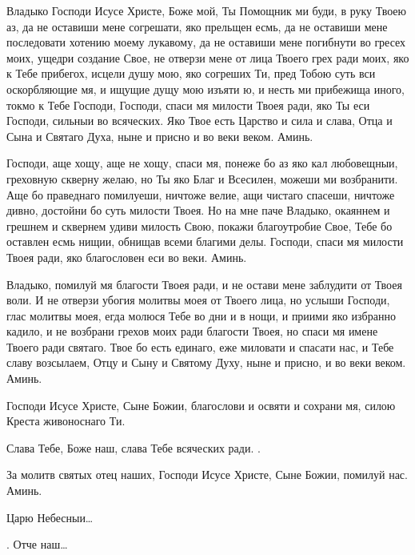 \begin{mymulticols}
Владыко Господи Исусе Христе, Боже мой, Ты Помощник ми буди, в руку Твоею аз, да не оставиши мене согрешати, яко прельщен есмь, да не оставиши мене последовати хотению моему лукавому, да не оставиши мене погибнути во гресех моих, ущедри создание Свое, не отверзи мене от лица Твоего грех ради моих, яко к Тебе прибегох, исцели душу мою, яко согреших Ти, пред Тобою суть вси оскорбляющие мя, и ищущие дущу мою изъяти ю, и несть ми прибежища иного, токмо к Тебе Господи, Господи, спаси мя милости Твоея ради, яко Ты еси Господи, сильныи во всяческих. Яко Твое есть Царство и сила и слава, Отца и Сына и Святаго Духа, ныне и присно и во веки веком. Аминь.



Господи, аще хощу, аще не хощу, спаси мя, понеже бо аз яко кал любовещныи, греховную скверну желаю, но Ты яко Благ и Всесилен, можеши ми возбранити. Аще бо праведнаго помилуеши, ничтоже велие, ащи чистаго спасеши, ничтоже дивно, достойни бо суть милости Твоея. Но на мне паче Владыко, окаяннем и грешнем и сквернем удиви милость Свою, покажи благоутробие Свое, Тебе бо оставлен есмь нищии, обнищав всеми благими делы. Господи, спаси мя милости Твоея ради, яко благословен еси во веки. Аминь.



Владыко, помилуй мя благости Твоея ради, и не остави мене заблудити от Твоея воли. И не отверзи убогия молитвы моея от Твоего лица, но услыши Господи, глас молитвы моея, егда молюся Тебе во дни и в нощи, и приими яко избранно кадило, и не возбрани грехов моих ради благости Твоея, но спаси мя имене Твоего ради святаго. Твое бо есть единаго, еже миловати и спасати нас, и Тебе славу возсылаем, Отцу и Сыну и Святому Духу, ныне и присно, и во веки веком. Аминь.



Господи Исусе Христе, Сыне Божии, благослови и освяти и сохрани мя, силою Креста живоноснаго Ти.


Слава Тебе, Боже наш, слава Тебе всяческих ради. .

За молитв святых отец наших, Господи Исусе Христе, Сыне Божии, помилуй нас. Аминь. 

Царю Небесныи…

.  Отче наш…


\end{mymulticols}
